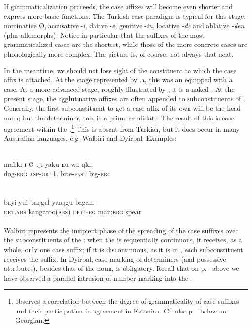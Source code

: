 If grammaticalization proceeds, the case affixes will become even shorter and express more basic functions. The Turkish case paradigm is typical for this stage: nominative Ø, accusative -\textit{i}, dative -\textit{e}, genitive -\textit{in}, locative -\textit{de} and ablative -\textit{den} (plus allomorphs). Notice in particular that the suffixes of the most grammaticalized cases are the shortest, while those of the more concrete cases are phonologically more complex. The picture is, of course, not always that neat.

In the meantime, we should not lose sight of the constituent to which the case affix is attached. At the stage represented by .a, this was an \np equipped with a case. At a more advanced stage, roughly illustrated by , it is a naked \np. At the present stage, the agglutinative affixes are often appended to subconstituents of \nps. Generally, the first subconstituent to get a case affix of its own will be the head noun; but the determiner, too, is a prime candidate. The result of this is case agreement within the \np.\footnote{\citet[117]{Kahr1976} observes a correlation between the degree of grammaticality of case suffixes and their participation in agreement in Estonian. Cf. also p.~\pageref{page101}\chkfn%
 below on Georgian.} This is absent from Turkish, but it does occur in many Australian languages, e.g. Walbiri and Dyirbal. Examples:

\ea\label{ex:E59}
\\
\gll   maliki-i  Ø-tji  yaku-nu  wii-ŋki.\\
 dog-\textsc{erg}  {\textsc{asp}-\textsc{obj}.1.\glsg}  bite-\textsc{past}  big-\textsc{erg}\\
\\
\z
\noindent \ea\label{ex:E60}
\\
\gll bayi  yui  baŋgul  yaaŋgu  bagan.\\
 \textsc{det}.\textsc{abs}  kangaroo(\textsc{abs})  \textsc{det}:\textsc{erg}  man:\textsc{erg}  spear\\
\\
\z
\noindent Walbiri represents the incipient phase of the spreading of the case suffixes over the subconstituents of the \np: when the \np is sequentially continuous, it receives, as a whole, only one case suffix; if it is discontinuous, as it is in , each subconstituent receives the suffix.\label{page92} In Dyirbal, case marking of determiners (and possessive attributes), besides that of the noun, is obligatory. Recall that on p.~\pageref{page63}\chk%
  above we have observed a parallel intrusion of number marking into the \np.

